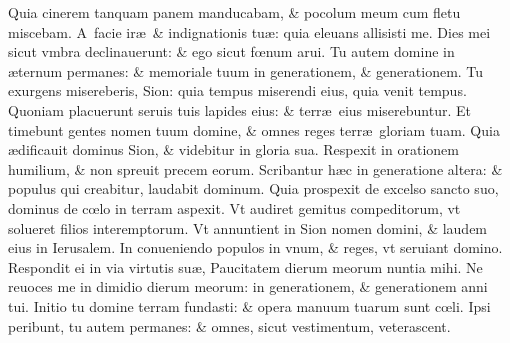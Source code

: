 \documentclass[a5paper,10pt]{book}
\def\ae{æ}
\def\oe{œ}
\begin{document}
\begin{multicols*}{2}
\newline \color{red} Q\color{black}uia cinerem tanquam panem manducabam, \& pocolum meum cum fletu miscebam.%
\newline \color{red} A\color{black}\ facie ir\ae \ \& indignationis tu\ae : quia eleuans allisisti me.
\newline \color{red} D\color{black}ies mei sicut vmbra declinauerunt: \& ego sicut f\oe num arui.
\newline \color{red} T\color{black}u autem domine in \ae ternum permanes: \& memoriale tuum in generationem, \& generationem.
\newline \color{red} T\color{black}u exurgens misereberis, Sion: quia tempus miserendi eius, quia venit tempus.
\newline \color{red} Q\color{black}uoniam placuerunt seruis tuis lapides eius: \& terr\ae \ eius miserebuntur.
\newline \color{red} E\color{black}t timebunt gentes nomen tuum domine, \& omnes reges terr\ae \ gloriam tuam.
\newline \color{red} Q\color{black}uia \ae dificauit dominus Sion, \& videbitur in gloria sua.
\newline \color{red} R\color{black}espexit in orationem humilium, \& non spreuit precem eorum.
\newline \color{red} S\color{black}cribantur h\ae c in generatione altera: \& populus qui creabitur, laudabit dominum.
\newline \color{red} Q\color{black}uia prospexit de excelso sancto suo, dominus de c\oe lo in terram aspexit.
\newline \color{red} V\color{black}t audiret gemitus compeditorum, vt solueret filios interemptorum.
\newline \color{red} V\color{black}t annuntient in Sion nomen domini, \& laudem eius in Ierusalem.
\newline \color{red} I\color{black}n conueniendo populos in vnum, \& reges, vt seruiant domino.
\newline \color{red} R\color{black}espondit ei in via virtutis su\ae , Paucitatem dierum meorum nuntia mihi.
\newline \color{red} N\color{black}e reuoces me in dimidio dierum meorum: in generationem, \& generationem anni tui.
\newline \color{red} I\color{black}nitio tu domine terram fundasti: \& opera manuum tuarum sunt c\oe li.
\newline \color{red} I\color{black}psi peribunt, tu autem permanes: \& omnes, sicut vestimentum, veterascent.

\end{multicols*}
\end{document}
